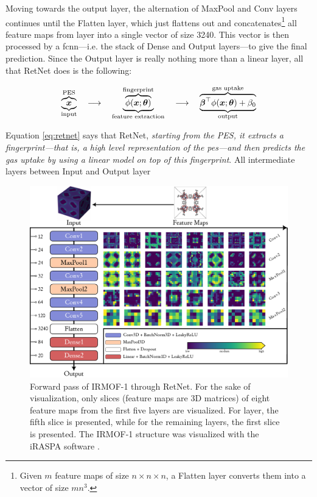 Moving towards the output layer, the alternation of MaxPool and Conv layers
continues until the Flatten layer, which just flattens out
and concatenates\footnote{Given $m$ feature maps of size $n \times n \times n$,
a Flatten layer converts them into a vector of size $mn^3$.} all feature maps
from  layer into a single vector of size \num{3240}. This vector is then
processed by a \gls{fcnn}---i.e. the stack of Dense and
Output layers---to give the final prediction. Since the Output
layer is really nothing more than a linear
layer, all that RetNet does is the following:

\begin{equation}
	\label{eq:retnet}
	\underbrace{\overbrace{\boldsymbol{x}}^\text{PES}}_\text{input}
	\quad \longrightarrow \quad
	\underbrace{
		\overbrace{\phi(\boldsymbol{x};\boldsymbol{\theta})}
		^\text{fingerprint}
	}_\text{feature extraction}
	\quad \longrightarrow \quad
	\underbrace{
		\overbrace{\boldsymbol{\beta}^\top\phi(\boldsymbol{x};\boldsymbol{\theta}) + \beta_0}
		^\text{gas uptake}
	}_\text{output}
\end{equation}

Equation \ref{eq:retnet} says that RetNet, \emph{starting from the PES, it
extracts a fingerprint---that is, a high level
representation of the \gls{pes}---and then
predicts the gas uptake by using a linear model on top of this fingerprint}. All
intermediate layers between Input and Output layer

\begin{figure}
	\centering
	\includegraphics[width=\textwidth]{fig/forward_pass.pdf}
	\caption[RetNet architecture.]{Forward pass of
	IRMOF-1 through RetNet. For the sake of
	visualization, only slices (feature maps are 3D matrices)
	of eight feature maps from the first five layers are visualized. For
	 layer, the fifth slice is presented, while for the remaining
	layers, the first slice is presented. The IRMOF-1 structure was visualized
	with the iRASPA software \parencite{Dubbeldam2018}.}
	\label{fig:retnet}
\end{figure}

